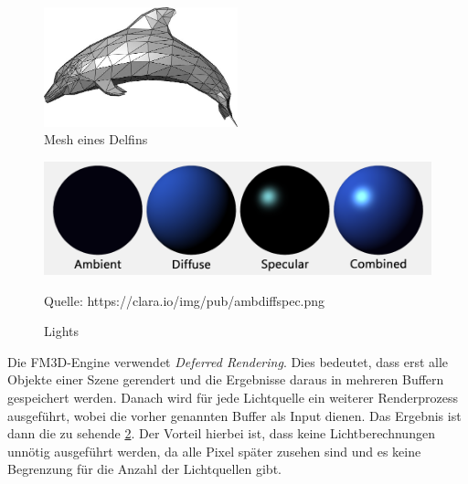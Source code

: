 \begin{figure}
	\begin{center}
		\includegraphics[width=0.5\textwidth]{06anhang/bilder/delphin.jpg}
		\caption{Mesh eines Delfins}
		\label{Dolphin}
	\end{center}
\end{figure}
\begin{figure}
	\centering
	\includegraphics[scale=0.4]{02theorie/amb_diff_spec.png}
		
	Quelle: https://clara.io/img/pub/amb\textunderscore diff\textunderscore spec.png
	\caption{Lights}\label{Img:Lights}
\end{figure}

Die FM3D-Engine verwendet \textit{Deferred Rendering}. Dies bedeutet, dass erst alle Objekte einer Szene gerendert und die Ergebnisse daraus in mehreren Buffern gespeichert werden. Danach wird für jede Lichtquelle ein weiterer Renderprozess ausgeführt, wobei die vorher genannten Buffer als Input dienen. Das Ergebnis ist dann die zu sehende \cref{Img:Lights}. Der Vorteil hierbei ist, dass keine Lichtberechnungen unnötig ausgeführt werden, da alle Pixel später zusehen sind und es keine Begrenzung für die Anzahl der Lichtquellen gibt. 
